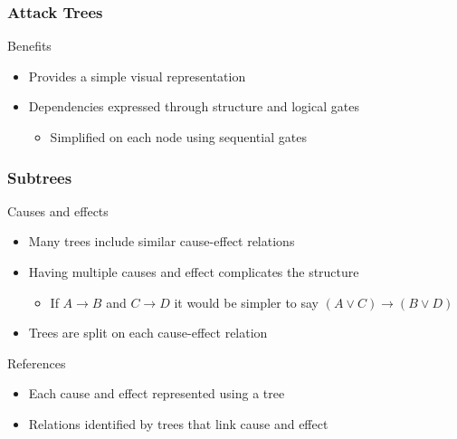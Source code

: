 

\begin{frame}\frametitle{Attack Trees}
  \begin{block}{Benefits}
    \begin{itemize}
      \item Provides a simple visual representation
      \item Dependencies expressed through structure and logical gates
      \begin{itemize}
        \item Simplified on each node using sequential gates
      \end{itemize}
    \end{itemize}
  \end{block}
\end{frame}





\begin{frame}\frametitle{Subtrees}
  \begin{block}{Causes and effects}
    \begin{itemize}
      \item Many trees include similar cause-effect relations
      \item Having multiple causes and effect complicates the structure
      \begin{itemize}
        \item If $A \rightarrow B$ and $C \rightarrow D$ it would be simpler to say $(A \vee C) \rightarrow (B \vee D)$
      \end{itemize}
      \item Trees are split on each cause-effect relation
    \end{itemize}
  \end{block}
  \begin{block}{References}
    \begin{itemize}
      \item Each cause and effect represented using a tree
      \item Relations identified by trees that link cause and effect
    \end{itemize}
  \end{block}
\end{frame}

